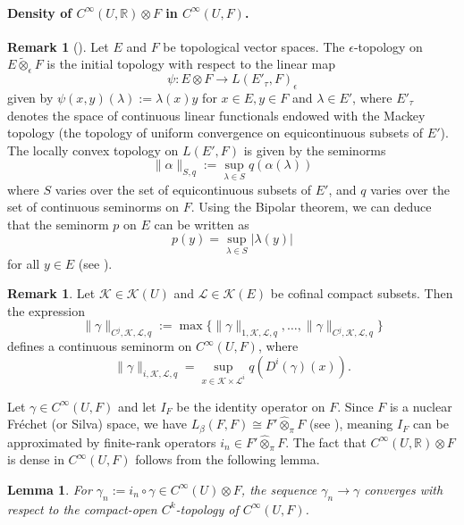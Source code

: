 \documentclass[11pt,reqno]{amsart}
\newtheorem{lemma}[theorem]{Lemma}
\theoremstyle{definition}
\newtheorem{remark}[theorem]{Remark}
\numberwithin{equation}{section}
\begin{document}
\paragraph{Density of $C^{\infty}(U, \mathbb{R}) \otimes F$ in $C^{\infty}(U, F)$.}
\begin{remark}[{\cite[4.6]{14}}]
Let $E$ and $F$ be topological vector spaces. The $\epsilon$-topology on $E \tilde{\otimes}_{\epsilon} F$ is the initial topology with respect to the linear map
\[
\psi : E \otimes F \rightarrow L(E'_{\tau}, F)_{\epsilon}
\]
given by $\psi(x, y)(\lambda) := \lambda(x)y$ for $x \in E, y \in F$ and $\lambda \in E'$, where $E'_{\tau}$ denotes the space of continuous linear functionals endowed with the Mackey topology (the topology of uniform convergence on equicontinuous subsets of $E'$). The locally convex topology on $L(E', F)$ is given by the seminorms
\[
\|\alpha\|_{S,q} := \sup_{\lambda \in S} q(\alpha(\lambda))
\]
where $S$ varies over the set of equicontinuous subsets of $E'$, and $q$ varies over the set of continuous seminorms on $F$. Using the Bipolar theorem, we can deduce that the seminorm $p$ on $E$ can be written as
\[
p(y) = \sup_{\lambda \in S} |\lambda(y)|
\]
for all $y \in E$ (see \cite[Section 4.7]{14}).
\end{remark}

\begin{remark}
Let $\mathcal{K} \in \mathcal{K}(U)$ and $\mathcal{L} \in \mathcal{K}(E)$ be cofinal compact subsets. Then the expression
\[
\|\gamma\|_{C^j, \mathcal{K}, \mathcal{L}, q} := \max\{\|\gamma\|_{1, \mathcal{K}, \mathcal{L}, q}, \dots, \|\gamma\|_{C^j, \mathcal{K}, \mathcal{L}, q}\}
\]
defines a continuous seminorm on $C^{\infty}(U, F)$, where
\[
\|\gamma\|_{i, \mathcal{K}, \mathcal{L}, q} = \sup_{x \in \mathcal{K} \times \mathcal{L}^i} q(D^i(\gamma)(x)).
\]
\end{remark}

Let $\gamma \in C^{\infty}(U, F)$ and let $I_F$ be the identity operator on $F$. Since $F$ is a nuclear Fréchet (or Silva) space, we have $L_{\beta}(F, F) \cong F' \hat{\otimes}_{\pi} F$ (see \cite[Proposition 50.5]{31}), meaning $I_F$ can be approximated by finite-rank operators $i_n \in F' \hat{\otimes}_{\pi} F$. The fact that $C^{\infty}(U, \mathbb{R}) \otimes F$ is dense in $C^{\infty}(U, F)$ follows from the following lemma.

\begin{lemma}
For $\gamma_n := i_n \circ \gamma \in C^{\infty}(U) \otimes F$, the sequence $\gamma_n \rightarrow \gamma$ converges with respect to the compact-open $C^k$-topology of $C^{\infty}(U, F)$.
\end{lemma}
\end{document}
